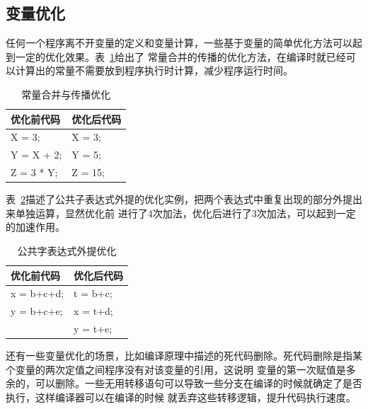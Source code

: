 \subsection{变量优化}
任何一个程序离不开变量的定义和变量计算，一些基于变量的简单优化方法可以起到一定的优化效果。表~\ref{table2}给出了
常量合并的传播的优化方法，在编译时就已经可以计算出的常量不需要放到程序执行时计算，减少程序运行时间。
\begin{table}[h]
  \centering
  \caption{常量合并与传播优化}
  \begin{tabular}{ll}
    \hline
    优化前代码     & 优化后代码   \\
    \hline
    X = 3;         & X = 3;    \\
    Y = X + 2;       & Y = 5; \\
    Z = 3 * Y;      & Z = 15; \\
   \hline
  \end{tabular}
  \label{table2}
\end{table}
表~\ref{table3}描述了公共子表达式外提的优化实例，把两个表达式中重复出现的部分外提出来单独运算，显然优化前
进行了4次加法，优化后进行了3次加法，可以起到一定的加速作用。
\begin{table}[h]
  \centering
  \caption{公共字表达式外提优化}
  \begin{tabular}{ll}
    \hline
    优化前代码      & 优化后代码   \\
    \hline
    x = b+c+d;      & t = b+c;    \\
    y = b+c+e;      & x = t+d; \\
                    & y = t+e; \\
   \hline
  \end{tabular}
  \label{table3}
\end{table}
还有一些变量优化的场景，比如编译原理中描述的死代码删除。死代码删除是指某个变量的两次定值之间程序没有对该变量的引用，这说明
变量的第一次赋值是多余的，可以删除。一些无用转移语句可以导致一些分支在编译的时候就确定了是否执行，这样编译器可以在编译的时候
就丢弃这些转移逻辑，提升代码执行速度。

